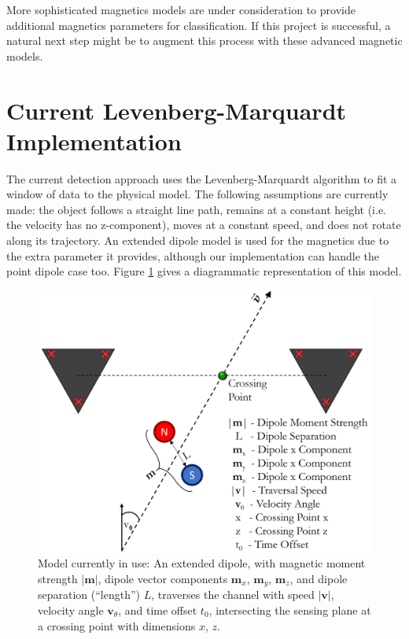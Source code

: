 \documentclass[10pt, a4paper, twocolumn]{article} %
\begin{document}
More sophisticated magnetics models are under consideration to provide additional magnetics parameters for classification. If this project is successful, a natural next step might be to augment this process with these advanced magnetic models.

\section{Current Levenberg-Marquardt Implementation}

The current detection approach uses the Levenberg-Marquardt algorithm to fit a window of data to the physical model. The following assumptions are currently made: the object follows a straight line path, remains at a constant height (i.e. the velocity has no z-component), moves at a constant speed, and does not rotate along its trajectory. An extended dipole model is used for the magnetics due to the extra parameter it provides, although our implementation can handle the point dipole case too. Figure \ref{forward_model} gives a diagrammatic representation of this model.

\begin{figure}
	\includegraphics[width=\linewidth]{Figures/reparam_forward_model.png} %
	\caption{Model currently in use: An extended dipole, with magnetic moment strength $|\mathbf{m}|$, dipole vector components $\mathbf{m}_x$, $\mathbf{m}_y$, $\mathbf{m}_z$, and dipole separation (“length”) $L$, traverses the channel with speed $|\mathbf{v}|$, velocity angle $\mathbf{v}_\theta$, and time offset $t_0$, intersecting the sensing plane at a crossing point with dimensions $x$, $z$.}
	\label{forward_model}
\end{figure}
\end{document}
